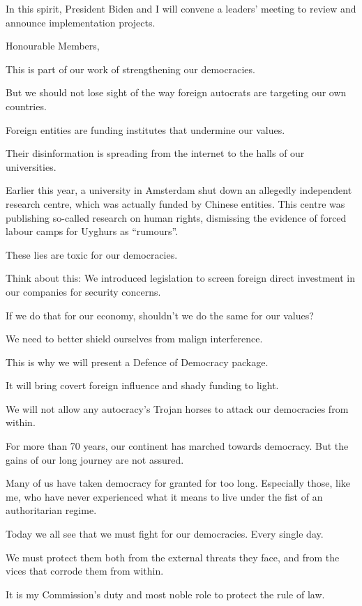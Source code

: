 \documentclass[a4paper,11pt]{article}
\begin{document}
In this spirit, President Biden and I will convene a leaders' meeting to review and announce implementation projects.

 

Honourable Members,

This is part of our work of strengthening our democracies.

But we should not lose sight of the way foreign autocrats are targeting our own countries.

Foreign entities are funding institutes that undermine our values.

Their disinformation is spreading from the internet to the halls of our universities.

Earlier this year, a university in Amsterdam shut down an allegedly independent research centre, which was actually funded by Chinese entities. This centre was publishing so-called research on human rights, dismissing the evidence of forced labour camps for Uyghurs as “rumours”.

These lies are toxic for our democracies.

Think about this: We introduced legislation to screen foreign direct investment in our companies for security concerns.

If we do that for our economy, shouldn't we do the same for our values?

We need to better shield ourselves from malign interference.

This is why we will present a Defence of Democracy package.

It will bring covert foreign influence and shady funding to light.

We will not allow any autocracy's Trojan horses to attack our democracies from within.

 

For more than 70 years, our continent has marched towards democracy. But the gains of our long journey are not assured.

Many of us have taken democracy for granted for too long. Especially those, like me, who have never experienced what it means to live under the fist of an authoritarian regime.

Today we all see that we must fight for our democracies. Every single day.

We must protect them both from the external threats they face, and from the vices that corrode them from within.

It is my Commission's duty and most noble role to protect the rule of law.
\end{document}
